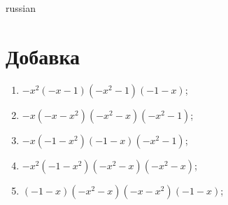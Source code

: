 \documentclass[20pt,a4paper]{book}
\begin{document}
\begin{otherlanguage*}{russian}
\newcommand{\HRule}{\rule{\linewidth}{0.5mm}}
\renewcommand{\chaptername}{Серия}

\setcounter{chapter}{3}

\chapter{Добавка}\begin{enumerate}
\item $-x^2(-x - 1)(-x^2 - 1)(-1 - x)$;
\item $-x(-x - x^2)(-x^2 - x)(-x^2 - 1)$;
\item $-x(-1 - x^2)(-1 - x)(-x^2 - 1)$;
\item $-x^2(-1 - x^2)(-x^2 - x)(-x^2 - x)$;
\item $(-1 - x)(-x^2 - x)(-x - x^2)(-1 - x)$;
\end{enumerate}
\end{otherlanguage*}
\end{document}

